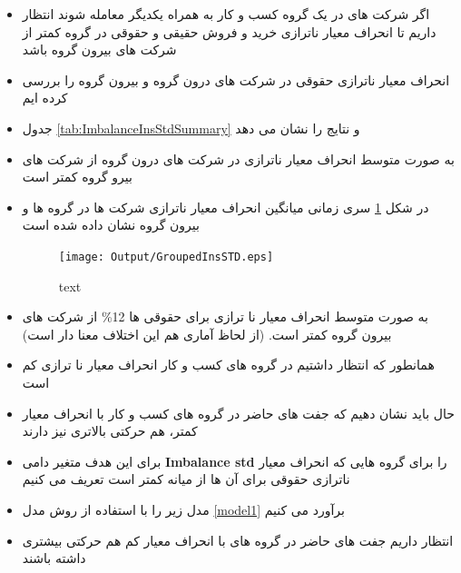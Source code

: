 \documentclass[12pt, a4paper]{article}
\begin{document}
 \begin{itemize}
 	\item 
 	اگر شرکت های در یک گروه کسب و کار به همراه یکدیگر معامله شوند انتظار داریم تا انحراف معیار ناترازی خرید و فروش حقیقی و حقوقی در گروه کمتر از شرکت های بیرون گروه باشد
 	\item 
 	انحراف معیار ناترازی حقوقی در شرکت های درون گروه و بیرون گروه را بررسی کرده ایم
 		\item 
 	جدول 
 		\ref{tab:ImbalanceInsStdSummary}
 	و
 	نتایج را نشان می دهد
 	\begin{LTR}
 	\end{LTR}

 		\item 
 	به صورت متوسط انحراف معیار ناترازی در شرکت های درون گروه از شرکت های بیرو گروه کمتر است	
 	
 	\item 
 	در شکل 
 	\ref{fig:GroupedInsSTD}
 	سری زمانی میانگین انحراف معیار ناترازی شرکت ها در گروه ها و بیرون گروه نشان داده شده است
 	\begin{figure}[htbp]
 		\centering
 		\caption{text}
 		\texttt{[image: Output/GroupedInsSTD.eps]}
 		\label{fig:GroupedInsSTD}
 	\end{figure}

 	\item 
 	به صورت متوسط انحراف معیار نا ترازی برای حقوقی ها 12\%
 	از شرکت های بیرون گروه کمتر است. (از لحاظ آماری هم این اختلاف معنا دار است)
 	
 \end{itemize}
  

\begin{itemize}
	\item 
	همانطور که انتظار داشتیم در گروه های کسب و کار انحراف معیار نا ترازی کم است
	\item 
	حال باید نشان دهیم که جفت های حاضر  در گروه های کسب و کار با انحراف معیار کمتر، هم حرکتی بالاتری نیز دارند
	\item 
	برای این هدف متغیر دامی 
	\textbf{Imbalance std}
	را برای گروه هایی که انحراف معیار ناترازی حقوقی برای آن ها از میانه کمتر است تعریف می کنیم
	\item 
	مدل زیر را با استفاده از روش مدل 
	\ref{model1}
	برآورد می کنیم
	
	\item 
	انتظار داریم جفت های حاضر در گروه های با انحراف معیار کم هم حرکتی بیشتری داشته باشند
	
\end{itemize}
\end{document}
